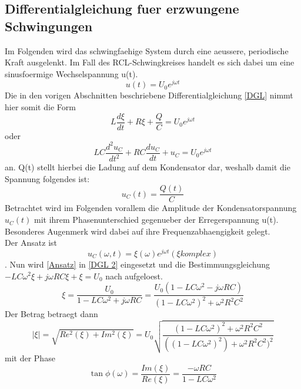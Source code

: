 \documentclass[titlepage=firstcover, captions=tableheading]{scrartcl}
\begin{document}
\subsection{Differentialgleichung fuer erzwungene Schwingungen}
Im Folgenden wird das schwingfaehige System durch eine aeussere, periodische Kraft ausgelenkt. Im Fall des RCL-Schwingkreises handelt es sich dabei um eine sinusfoermige Wechselspannung u(t).
\begin{equation}
    u(t)=U_0e^{j\omega t}\nonumber
\end{equation}
Die in den vorigen Abschnitten beschriebene Differentialgleichung \ref{DGL} nimmt hier somit die Form
\begin{equation}
    L\frac{d\xi}{dt}+R\xi+\frac{Q}{C}=U_0e^{j\omega t}\nonumber
\end{equation}
oder 
\begin{equation}\label{DGL 2}
    LC\frac{d^2u_C}{dt^2}+RC\frac{du_C}{dt}+u_C=U_0e^{j\omega t}
\end{equation}
an. 
Q(t) stellt hierbei die Ladung auf dem Kondensator dar, weshalb damit die Spannung folgendes ist:
\begin{equation}
    u_C(t)=\frac{Q(t)}{C}\nonumber
\end{equation}
Betrachtet wird im Folgenden vorallem die Amplitude der Kondensatorspannung $u_C(t)$ mit ihrem Phasenunterschied gegenueber der Erregerspannung u(t). Besonderes Augenmerk wird dabei auf ihre Frequenzabhaengigkeit gelegt.\\
Der Ansatz ist
\begin{equation}\label{Ansatz}
    u_C(\omega, t)=\xi(\omega)e^{j\omega t} (\xi komplex) 
\end{equation}.
Nun wird \ref{Ansatz} in \ref{DGL 2} eingesetzt und die Bestimmungsgleichung $-LC\omega^2\xi+j\omega RC\xi+\xi=U_0$ nach \xi aufgeloest.
\begin{equation}
    \xi=\frac{U_0}{1-LC\omega^2+j\omega RC}=\frac{U_0(1-LC\omega^2-j\omega RC)}{(1-LC\omega^2)^2+\omega^2R^2C^2} \nonumber
\end{equation}
Der Betrag betraegt dann 
\begin{equation}\label{Betrag}
    |\xi|=\sqrt{Re^2(\xi)+Im^2(\xi)}=U_0\sqrt{\frac{(1-LC\omega^2)^2+\omega^2R^2C^2}{((1-LC\omega^2)^2)+\omega^2R^2C^2)^2}}
\end{equation}
mit der Phase
\begin{equation}
    \tan \phi(\omega)=\frac{Im(\xi)}{Re(\xi)}=\frac{-\omega RC}{1-LC\omega^2}\nonumber
\end{equation}
\end{document}
